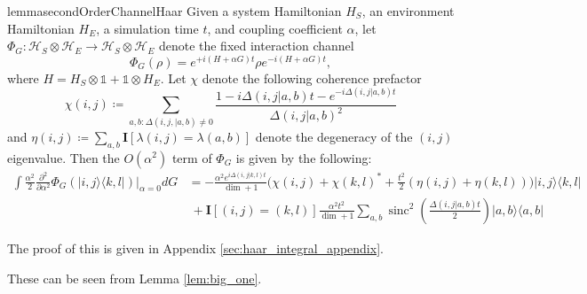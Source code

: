 \documentclass{article}
\newcommand{\ketbra}[2]{| #1\rangle\! \langle #2|}
\newcommand{\bigo}[1]{O\left( #1 \right)}
\newcommand{\hilb}{\mathcal{H}}
\newcommand{\identity}{\mathds{1}}
\DeclareMathOperator{\sinc}{sinc}
\begin{document}
\begin{restatable}{lemma}{secondOrderChannelHaar} \label{lem:big_one}
    Given a system Hamiltonian $H_{S}$, an environment Hamiltonian $H_{E}$, a simulation time $t$, and coupling coefficient $\alpha$, let $\Phi_G : \hilb_S \otimes \hilb_E \to \hilb_S \otimes \hilb_E$ denote the fixed interaction channel 
    \begin{equation}
        \Phi_G(\rho) = e^{+i (H + \alpha G)t} \rho e^{-i (H + \alpha G)t},
    \end{equation}
    where $H = H_S \otimes \identity + \identity \otimes H_E$. Let $\chi$ denote the following coherence prefactor
$$ \chi(i,j) \coloneqq \sum_{a,b: \Delta(i,j,|a,b) \neq 0} \frac{1 - i \Delta(i,j|a,b)t - e^{-i \Delta(i,j|a,b) t}}{\Delta(i,j|a,b)^2} $$
and $\eta(i,j) \coloneqq \sum_{a, b} \mathbf{I}[\lambda(i,j) = \lambda(a, b)]$ denote the degeneracy of the $(i,j)$ eigenvalue. Then the $\bigo{\alpha^2}$ term of $\Phi_G$ is given by the following:
 \begin{align}
     \int \frac{\alpha^2 }{2}\frac{\partial^2}{\partial \alpha^2} \Phi_G(\ketbra{i,j}{k,l})\bigg|_{\alpha = 0} dG &= -\frac{\alpha^2  e^{i \Delta(i,j|k,l) t}}{\dim + 1} \bigg(\chi(i,j) + \chi(k,l)^*  + \frac{t^2}{2}(\eta(i,j) + \eta(k,l)) \bigg) \ketbra{i,j}{k,l} \nonumber \\
    &~ + \mathbf{I}[(i,j) = (k,l)]  \frac{\alpha^2 t^2}{\dim+1} \sum_{a,b} \sinc^2 \left( \frac{\Delta(i,j|a,b)t}{2} \right) \ketbra{a,b}{a,b}  \label{eq:el_gigante}
 \end{align}
\end{restatable}
The proof of this is given in Appendix \ref{sec:haar_integral_appendix}. 

These can be seen from Lemma \ref{lem:big_one}.
\end{document}
